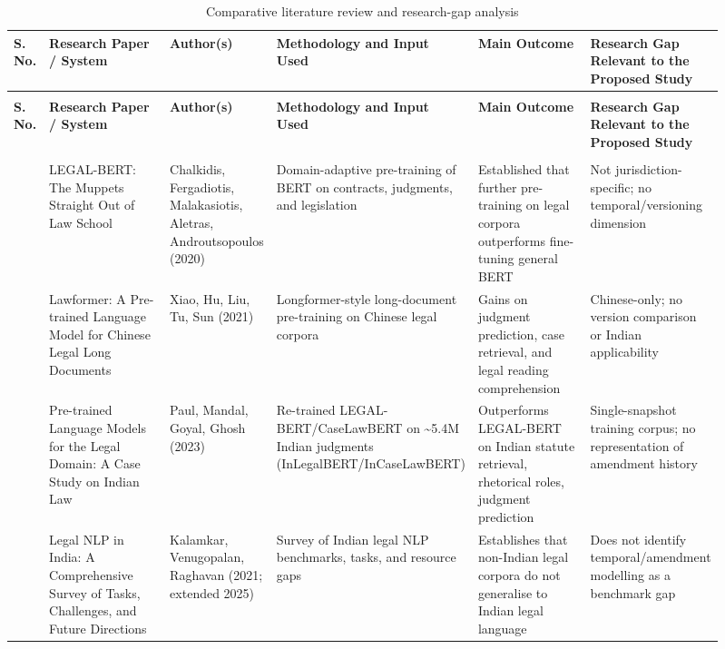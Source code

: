 \begin{landscape}
\footnotesize
\begin{longtable}[l]{>{\raggedright\arraybackslash}p{0.04\linewidth} >{\raggedright\arraybackslash}p{0.20\linewidth} >{\raggedright\arraybackslash}p{0.14\linewidth} >{\raggedright\arraybackslash}p{0.18\linewidth} >{\raggedright\arraybackslash}p{0.18\linewidth} >{\raggedright\arraybackslash}p{0.17\linewidth}}
\caption{Comparative literature review and research-gap analysis}\label{tab:lit-9}\\
\toprule
\textbf{S. No.} & \textbf{Research Paper / System} & \textbf{Author(s)} & \textbf{Methodology and Input Used} & \textbf{Main Outcome} & \textbf{Research Gap Relevant to the Proposed Study} \\
\midrule
\endfirsthead
\multicolumn{6}{l}{\small\itshape (Table \thetable{} continued)}\\
\toprule
\textbf{S. No.} & \textbf{Research Paper / System} & \textbf{Author(s)} & \textbf{Methodology and Input Used} & \textbf{Main Outcome} & \textbf{Research Gap Relevant to the Proposed Study} \\
\midrule
\endhead
\midrule
\multicolumn{6}{r}{\small\itshape Continued on next page}\\
\endfoot
\bottomrule
\endlastfoot
1 & LEGAL-BERT: The Muppets Straight Out of Law School & Chalkidis, Fergadiotis, Malakasiotis, Aletras, Androutsopoulos (2020) & Domain-adaptive pre-training of BERT on contracts, judgments, and legislation & Established that further pre-training on legal corpora outperforms fine-tuning general BERT & Not jurisdiction-specific; no temporal/versioning dimension \\
2 & Lawformer: A Pre-trained Language Model for Chinese Legal Long Documents & Xiao, Hu, Liu, Tu, Sun (2021) & Longformer-style long-document pre-training on Chinese legal corpora & Gains on judgment prediction, case retrieval, and legal reading comprehension & Chinese-only; no version comparison or Indian applicability \\
3 & Pre-trained Language Models for the Legal Domain: A Case Study on Indian Law & Paul, Mandal, Goyal, Ghosh (2023) & Re-trained LEGAL-BERT/CaseLawBERT on \textasciitilde{}5.4M Indian judgments (InLegalBERT/InCaseLawBERT) & Outperforms LEGAL-BERT on Indian statute retrieval, rhetorical roles, judgment prediction & Single-snapshot training corpus; no representation of amendment history \\
4 & Legal NLP in India: A Comprehensive Survey of Tasks, Challenges, and Future Directions & Kalamkar, Venugopalan, Raghavan (2021; extended 2025) & Survey of Indian legal NLP benchmarks, tasks, and resource gaps & Establishes that non-Indian legal corpora do not generalise to Indian legal language & Does not identify temporal/amendment modelling as a benchmark gap \\

\end{longtable}
\end{landscape}
